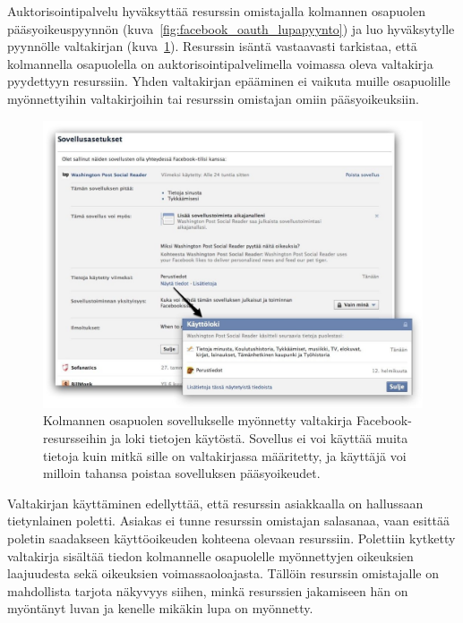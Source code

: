 \documentclass[finnish,gradu]{tktltiki}
\begin{document}
  Auktorisointipalvelu hyväksyttää resurssin omistajalla kolmannen osapuolen pääsyoikeuspyynnön (kuva~\ref{fig:facebook_oauth_lupapyynto}) ja luo hyväksytylle pyynnölle valtakirjan (kuva~\ref{fig:facebook_app_acl}). Resurssin isäntä vastaavasti tarkistaa, että kolmannella osapuolella on auktorisointipalvelimella voimassa oleva valtakirja pyydettyyn resurssiin. Yhden valtakirjan epääminen ei vaikuta muille osapuolille myönnettyihin valtakirjoihin tai resurssin omistajan omiin pääsyoikeuksiin.

  \begin{figure}
    \centering
    \includegraphics[width=1.0\textwidth]{images/fb_app_acl.jpg}
    \caption[Valtakirja Facebook-resursseihin.]{Kolmannen osapuolen sovellukselle myönnetty valtakirja Facebook-resursseihin ja loki tietojen käytöstä. Sovellus ei voi käyttää muita tietoja kuin mitkä sille on valtakirjassa määritetty, ja käyttäjä voi milloin tahansa poistaa sovelluksen pääsyoikeudet.}
    \label{fig:facebook_app_acl}
  \end{figure}

  Valtakirjan käyttäminen edellyttää, että resurssin asiakkaalla on hallussaan tietynlainen poletti.   Asiakas ei tunne resurssin omistajan salasanaa, vaan esittää poletin saadakseen käyttöoikeuden kohteena olevaan resurssiin. Polettiin kytketty valtakirja sisältää tiedon kolmannelle osapuolelle myönnettyjen oikeuksien laajuudesta sekä oikeuksien voimassaoloajasta. Tällöin resurssin omistajalle on mahdollista tarjota näkyvyys siihen, minkä resurssien jakamiseen hän on myöntänyt luvan ja kenelle mikäkin lupa on myönnetty.
\end{document}
